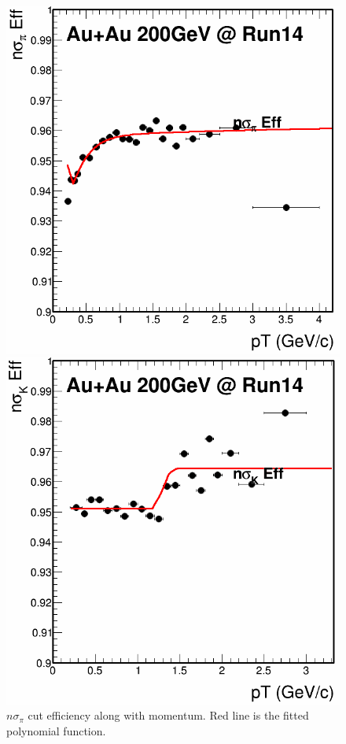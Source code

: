 \begin{figure}[htbp]
\begin{minipage}[htbp]{0.5\linewidth}
\centering
\includegraphics[width=1.0\textwidth]{figure/Run14_D0HFT/nSigPion_Eff.png}
\caption{$n\sigma_{\pi}$ cut efficiency along with momentum. Red line is the fitted polynomial function.\label{fig:pionnsigmaeff}}
\end{minipage}
\hfill
\begin{minipage}[htbp]{0.5\linewidth}
\centering
\includegraphics[width=1.0\textwidth]{figure/Run14_D0HFT/nSigKaon_Eff.png}

\end{minipage}
\end{figure}
